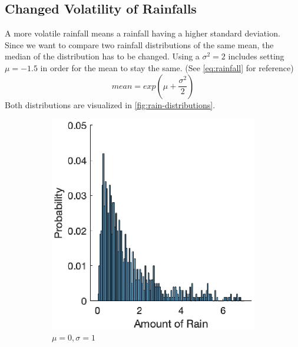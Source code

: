 \documentclass[12pt, a4paper, oneside]{article}
\begin{document}
\subsection{Changed Volatility of Rainfalls}
A more volatile rainfall means a rainfall having a higher standard deviation.
Since we want to compare two rainfall distributions of the same mean, the median of the distribution has to be changed.
Using a $\sigma^2=2$ includes setting $\mu=-1.5$ in order for the mean to stay the same.
(See \ref{eq:rainfall} for reference) 
\begin{equation}
	mean = exp(\mu+\frac{\sigma^2}{2}) \label{eq:rainfall}
\end{equation} 
Both distributions are visualized in \ref{fig:rain-distributions}.
\begin{figure}
	\begin{subfigure}{0.5\textwidth}
		\centering
		\includegraphics[width=1\textwidth]{figures/rainfall-default.eps}
		\caption{$\mu=0, \sigma=1$}
		\label{fig:rainfall-default}
	\end{subfigure}%
	\begin{subfigure}{.5\textwidth}
		\centering

\end{subfigure}
\end{figure}
\end{document}
